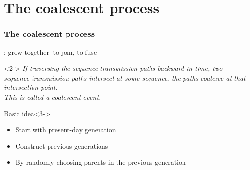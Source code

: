 \documentclass{beamer}
\begin{document}
    \section{The coalescent process}

        \begin{frame}
            \frametitle{The coalescent process}
            : grow together, to join, to fuse


            \begin{definition}<2->
                \textit{
                    If traversing the sequence-transmission paths backward in time,
                    two sequence transmission paths intersect at some sequence,
                    the paths coalesce at that intersection point. \\
                    This is called a coalescent event.
                }
            \end{definition}
        
            \begin{block}{Basic idea}<3->
                \begin{itemize}
                    \item<4-> Start with present-day generation
                    \item<5-> Construct previous generations
                    \item<6-> By randomly choosing parents in the previous generation
                \end{itemize}
            \end{block}
        \end{frame}
\end{document}
